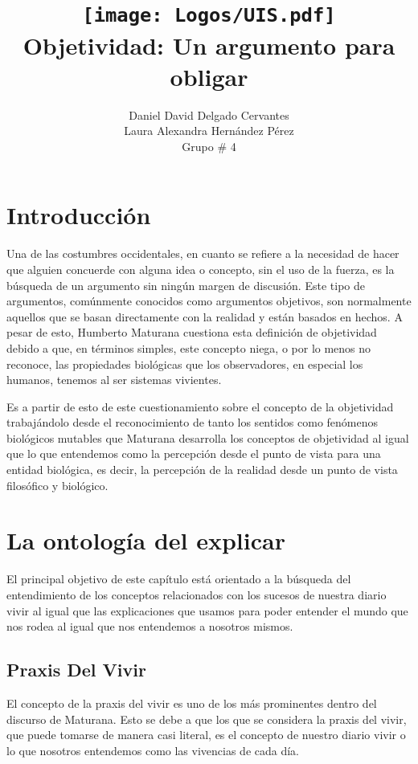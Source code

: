 \documentclass[10pt]{article}
\title{
    \texttt{[image: Logos/UIS.pdf]} \\
    Objetividad: Un argumento para obligar}
\author{Daniel David Delgado Cervantes \\  
        Laura Alexandra Hernández Pérez\\ 
        Grupo \# 4
}
\begin{document}
    
\maketitle

    \section{Introducción}

    Una de las costumbres occidentales, en cuanto se refiere a la necesidad de hacer que alguien concuerde con alguna idea o concepto, sin el uso de la fuerza, es la búsqueda de un argumento sin ningún margen de discusión. Este tipo de argumentos, comúnmente conocidos como argumentos objetivos, son normalmente aquellos que se basan directamente con la realidad y están basados en hechos. A pesar de esto, Humberto Maturana cuestiona esta definición de objetividad debido a que, en términos simples, este concepto niega, o por lo menos no reconoce, las propiedades biológicas que los observadores, en especial los humanos, tenemos al ser sistemas vivientes.

    Es a partir de esto de este cuestionamiento sobre el concepto de la objetividad trabajándolo desde el reconocimiento de tanto los sentidos como fenómenos biológicos mutables que Maturana desarrolla los conceptos de objetividad al igual que lo que entendemos como la percepción desde el punto de vista para una entidad biológica, es decir, la percepción de la realidad desde un punto de vista filosófico y biológico. 

    \section{La ontología del explicar}

    El principal objetivo de este capítulo está orientado a la búsqueda del entendimiento de los conceptos relacionados con los sucesos de nuestra diario vivir al igual que las explicaciones que usamos para poder entender el mundo que nos rodea al igual que nos entendemos a nosotros mismos.

        \subsection{Praxis Del Vivir}

        El concepto de la praxis del vivir es uno de los más prominentes dentro del discurso de Maturana. Esto se debe a que los que se considera la praxis del vivir, que puede tomarse de manera casi literal, es el concepto de nuestro diario vivir o lo que nosotros entendemos como las vivencias de cada día.
        
\end{document}
